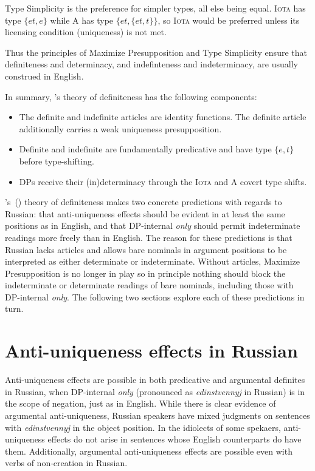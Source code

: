 \documentclass{article}
\newcommand{\citegen}[1]{\citeauthor{#1}'s~(\citeyear{#1})}
\begin{document}
Type Simplicity is the preference for simpler types, all else being equal. \textsc{Iota} has type $\lbrace et, e \rbrace$ while \textsc{A} has type $\lbrace et, \lbrace et, t \rbrace \rbrace$, so \textsc{Iota} would be preferred unless its licensing condition (uniqueness) is not met.

Thus the principles of Maximize Presupposition and Type Simplicity ensure that definiteness and determinacy, and indefinteness and indeterminacy, are usually construed in English.

In summary, \citeauthor{cb2015}'s theory of definiteness has the following components:

\begin{itemize}
	\item The definite and indefinite articles are identity functions. The definite article additionally carries a weak uniqueness presupposition.
	\item Definite and indefinite are fundamentally predicative and have type $\lbrace e, t \rbrace$ before type-shifting.
	\item DPs receive their (in)determinacy through the \textsc{Iota} and \textsc{A} covert type shifts.
\end{itemize}

\citegen{cb2015} theory of definiteness makes two concrete predictions with regards to Russian: that anti-uniqueness effects should be evident in at least the same positions as in English, and that DP-internal \textit{only} should permit indeterminate readings more freely than in English. The reason for these predictions is that Russian lacks articles and allows bare nominals in argument positions to be interpreted as either determinate or indeterminate. Without articles, Maximize Presupposition is no longer in play so in principle nothing should block the indeterminate or determinate readings of bare nominals, including those with DP-internal \textit{only}. The following two sections explore each of these predictions in turn.


\section{Anti-uniqueness effects in Russian \label{sec:anti-unique-ru}}
Anti-uniqueness effects are possible in both predicative and argumental definites in Russian, when DP-internal \textit{only} (pronounced as \textit{edinstvennyj} in Russian) is in the scope of negation, just as in English. While there is clear evidence of argumental anti-uniqueness, Russian speakers have mixed judgments on sentences with \textit{edinstvennyj} in the object position. In the idiolects of some spekaers, anti-uniqueness effects do not arise in sentences whose English counterparts do have them. Additionally, argumental anti-uniqueness effects are possible even with verbs of non-creation in Russian.
\end{document}
